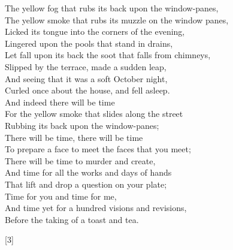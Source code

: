 \documentclass[twoside]{article}
\begin{document}
\begin{multicols}{2}

\begin{minipage}{10cm}
    \onehalfspacing
    \bigskip
    \centering
    The yellow fog that rubs its back upon the window-panes,\\
    The yellow smoke that rubs its muzzle on the window panes,\\
    Licked its tongue into the corners of the evening,\\
    Lingered upon the pools that stand in drains,\\
    Let fall upon its back the soot that falls from chimneys,\\
    Slipped by the terrace, made a sudden leap,\\
    And seeing that it was a soft October night,\\
    Curled once about the house, and fell asleep.\\
    And indeed there will be time\\
    For the yellow smoke that slides along the street\\
    Rubbing its back upon the window-panes;\\
    There will be time, there will be time\\
    To prepare a face to meet the faces that you meet;\\
    There will be time to murder and create,\\
    And time for all the works and days of hands\\
    That lift and drop a question on your plate;\\
    Time for you and time for me,\\
    And time yet for a hundred visions and revisions,\\
    Before the taking of a toast and tea.
    \begin{center}[3]\end{center}
\end{minipage}

\begin{minipage}{9cm}
\begin{center}


\end{center}
\end{minipage}
\end{multicols}
\end{document}
